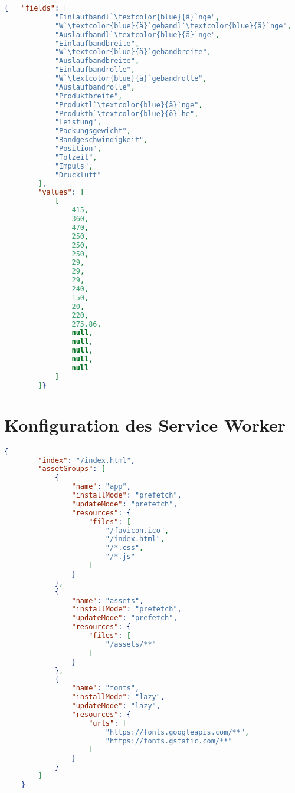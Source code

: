\begin{lstlisting}[language=JSON, caption=Testparameter für Postman, label=ls:anhang_postman, escapeinside=``]
    {   "fields": [
            "Einlaufbandl`\textcolor{blue}{ä}`nge",
            "W`\textcolor{blue}{ä}`gebandl`\textcolor{blue}{ä}`nge",
            "Auslaufbandl`\textcolor{blue}{ä}`nge",
            "Einlaufbandbreite",
            "W`\textcolor{blue}{ä}`gebandbreite",
            "Auslaufbandbreite",
            "Einlaufbandrolle",
            "W`\textcolor{blue}{ä}`gebandrolle",
            "Auslaufbandrolle",
            "Produktbreite",
            "Produktl`\textcolor{blue}{ä}`nge",
            "Produkth`\textcolor{blue}{ö}`he",
            "Leistung",
            "Packungsgewicht",
            "Bandgeschwindigkeit",
            "Position",
            "Totzeit",
            "Impuls",
            "Druckluft"
        ],
        "values": [
            [
                415,
                360,
                470,
                250,
                250,
                250,
                29,
                29,
                29,
                240,
                150,
                20,
                220,
                275.86,
                null,
                null,
                null,
                null,
                null
            ]
        ]}
\end{lstlisting}

\newpage

\section{Konfiguration des Service Worker}
\label{sec:serviceWorkerConfig}

\begin{lstlisting}[language=JSON, caption=Konfiguration des Service Workers, label=ls:anhang_serviceworker]
    {
        "index": "/index.html",
        "assetGroups": [
            {
                "name": "app",
                "installMode": "prefetch",
                "updateMode": "prefetch",
                "resources": {
                    "files": [
                        "/favicon.ico",
                        "/index.html",
                        "/*.css",
                        "/*.js"
                    ]
                }
            },
            {
                "name": "assets",
                "installMode": "prefetch",
                "updateMode": "prefetch",
                "resources": {
                    "files": [
                        "/assets/**"
                    ]
                }
            },
            {
                "name": "fonts",
                "installMode": "lazy",
                "updateMode": "lazy",
                "resources": {
                    "urls": [
                        "https://fonts.googleapis.com/**",
                        "https://fonts.gstatic.com/**"
                    ]
                }
            }
        ]
    }
\end{lstlisting}

